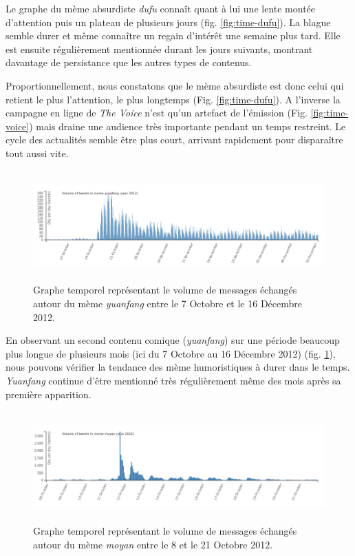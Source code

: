 Le graphe du mème absurdiste \textit{dufu} connaît quant à lui une lente montée d{\textquoteright}attention puis un plateau de plusieurs jours (fig. \ref{fig:time-dufu}). La blague semble durer et même conna\^itre un regain d{\textquoteright}intérêt une semaine plus tard. Elle est ensuite régulièrement mentionnée durant les jours suivants, montrant davantage de persistance que les autres types de contenus.

Proportionnellement, nous constatons que le mème absurdiste est donc celui qui retient le plus l{\textquoteright}attention, le plus longtemps (Fig. \ref{fig:time-dufu}). A l{\textquoteright}inverse la campagne en ligne de \textit{The Voice} n{\textquoteright}est qu{\textquoteright}un artefact de l{\textquoteright}émission (Fig. \ref{fig:time-voice}) mais draine une audience très importante pendant un temps restreint. Le cycle des actualités semble être plus court, arrivant rapidement pour disparaître tout aussi vite.

\begin{figure}[htbp]
    \centering
    
  \includegraphics[width=6.0087in,height=1.6697in]{figures/chap4/chapitre4-img5.png}
  \caption{
   Graphe temporel représentant le volume de messages échangés  autour du mème \textit{yuanfang} entre le 7 Octobre et le 16 Décembre 2012.
  }
  \label{fig:time-yuanfang}
\end{figure}

En observant un second contenu comique (\textit{yuanfang}) sur une période beaucoup plus longue de plusieurs mois (ici du 7 Octobre au 16 Décembre 2012) (fig. \ref{fig:time-yuanfang}), nous pouvons vérifier la tendance des mème humoristiques \`a durer dans le temps. \textit{Yuanfang} continue d{\textquoteright}être mentionné très régulièrement même des mois après sa première apparition. 

\begin{figure}[htbp]
    \centering
    \includegraphics[width=6.0087in,height=1.6697in]{figures/chap4/chapitre4-img6.png}
    \caption{
      Graphe temporel représentant le volume de messages échangés autour du mème \textit{moyan} entre le 8 et le 21 Octobre 2012.
    }
    \label{fig:time-moyan}
\end{figure}

